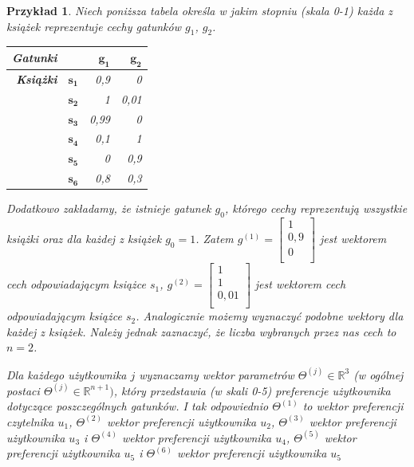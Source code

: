 \documentclass[12pt,a4paper]{report}
\newtheorem{przyklad}{Przykład}[chapter]
\newcommand{\setR}{\mathbb{R}}
\begin{document}
\begin{przyklad}
Niech poniższa tabela określa w jakim stopniu (skala 0-1) każda z książek reprezentuje cechy gatunków $g_1$, $g_2$.
\begin{center}
\begin{tabular}{|r|r|r|r|} \hline
\textbf{Gatunki} & & $\mathbf{g_1}$ & $\mathbf{g_2}$  \\
\hline
\hline
\textbf{Książki} &$\mathbf{s_1}$ & 0,9 & 0 \\
\hline
&$\mathbf{s_2}$ & 1 & 0,01  \\
\hline
&$\mathbf{s_3}$ & 0,99 & 0 \\
\hline
&$\mathbf{s_4}$ & 0,1 & 1 \\
\hline
&$\mathbf{s_5}$ & 0 & 0,9 \\
\hline
&$\mathbf{s_6}$ & 0,8 & 0,3 \\
\hline
\end{tabular}
\end{center}
Dodatkowo zakładamy, że istnieje gatunek $g_0$, którego cechy reprezentują wszystkie książki oraz dla każdej z książek $g_0=1$.
Zatem $g^{(1)}= \left[
        \begin{array}{c}
         1 \\
         0,9 \\
         0 \\
         \end{array}
      \right] $ jest wektorem cech odpowiadającym książce $s_1$, $g^{(2)}= \left[
        \begin{array}{c}
         1 \\
         1 \\
         0,01 \\
         \end{array}
      \right] $ jest wektorem cech odpowiadającym książce $s_2$. Analogicznie możemy wyznaczyć podobne wektory dla każdej z książek. Należy jednak zaznaczyć, że liczba wybranych przez nas cech to $n=2$.

Dla każdego użytkownika $j$ wyznaczamy wektor parametrów $\Theta^{(j)} \in \setR^3$ (w ogólnej postaci $\Theta^{(j)} \in\setR^{n+1})$, który przedstawia (w skali 0-5) preferencje użytkownika dotyczące poszczególnych gatunków. I tak odpowiednio $\Theta^{(1)}$ to wektor preferencji czytelnika $u_1$, $\Theta^{(2)}$ wektor preferencji użytkownika $u_2$, $\Theta^{(3)}$ wektor preferencji użytkownika $u_3$ i $\Theta^{(4)}$ wektor preferencji użytkownika $u_4$, $\Theta^{(5)}$ wektor preferencji użytkownika $u_5$ i $\Theta^{(6)}$ wektor preferencji użytkownika $u_5$


\end{przyklad}
\end{document}
